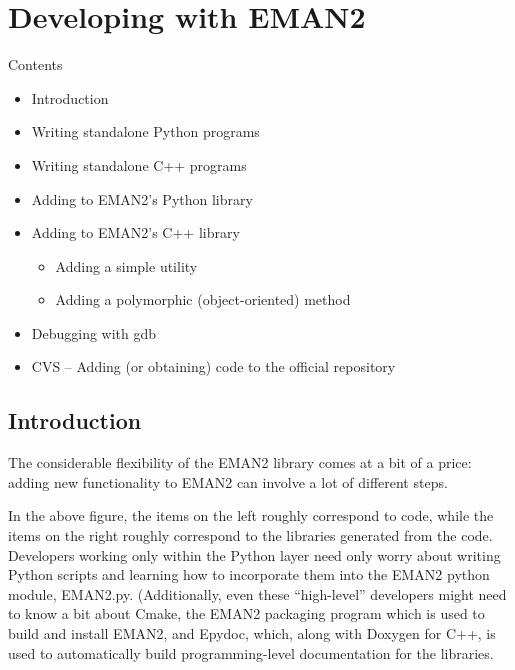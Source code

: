 %
\section{Developing with EMAN2}


 Contents
\begin{itemize}
\item Introduction
\item Writing standalone Python programs
\item Writing standalone C++ programs
\item Adding to EMAN2's Python library
\item Adding to EMAN2's C++ library\begin{itemize}
\item Adding a simple utility
\item Adding a polymorphic (object-oriented) method

\end{itemize}

\item Debugging with gdb
\item CVS -- Adding (or obtaining) code to the official repository

\end{itemize}
\subsection{Introduction}


 The considerable flexibility of the EMAN2 library comes at a bit of a price: adding new functionality to EMAN2 can involve a lot of different steps.

 In the above figure, the items on the left roughly correspond to code, while the items on the right roughly correspond to the libraries generated from the code. Developers working only within the Python layer need only worry about writing Python scripts and learning how to incorporate them into the EMAN2 python module, EMAN2.py. (Additionally, even these ``high-level'' developers might need to know a bit about Cmake, the EMAN2 packaging program which is used to build and install EMAN2, and Epydoc, which, along with Doxygen for C++, is used to automatically build programming-level documentation for the libraries.


